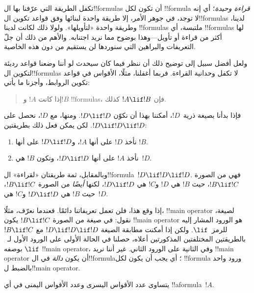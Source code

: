 \documentclass[../../../include/open-logic-section]{subfiles}
\begin{document}


\begin{explain}
تكفل الطريقة التي عرّفنا بها ال!!{formula}s أن تكون لكل !!{formula}
\emph{قراءة وحيدة}؛ أي إنه لا توجد، في جوهر الأمر، إلا طريقة واحدة
لبنائها وفق قواعد تكوين ال!!{formula}s لدينا، وطريقة واحدة
«لتأويلها». ولولا ذلك لكانت لدينا !!{formula}s ملتبسة، أي
!!{formula}s لها أكثر من قراءة أو تأويل---وهذا بوضوح مما نريد
اجتنابه. والأهم من ذلك أن جلّ التعريفات والبراهين التي سنوردها لن
يستقيم من دون هذه الخاصية.

ولعل أفضل سبيل إلى توضيح ذلك أن ننظر فيما كان سيحدث لو أننا وضعنا
قواعد رديئة لتكوين ال!!{formula}s لا تكفل وحدانية القراءة. فربما
أغفلنا، مثلًا، الأقواس في قواعد تكوين الروابط، وأجزنا ما يأتي:
\begin{quote}
إذا كانت $!A$ و$!B$ !!{formula}s، فإن $!A \lif !B$ كذلك.
\end{quote}
فإذا بدأنا بصيغة ذرية~$!D$، أمكننا بهذا أن نكوّن $!D
\lif !D$. ومنها، مع $!D$، نحصل على $!D \lif !D
\lif !D$. لكن يمكن فعل ذلك بطريقتين:
\begin{enumerate}
\item نأخذ $!D$ على أنها $!A$، و$!D \lif !D$ على أنها $!B$.
\item نأخذ $!A$ على أنها $!D \lif !D$، وتكون $!B$ هي~$!D$.
\end{enumerate}
وبالمقابل، ثمة طريقتان «لقراءة» ال!!{formula}~$!D \lif !D \lif
!D$. فهي من الصورة $!B \lif !C$، حيث $!B$ هي $!D$ و$!C$ هي $!D
\lif !D$، لكنها \emph{أيضًا} من الصورة $!B \lif !C$، حيث $!B$ هي
$!D \lif !D$ و$!C$ هي~$!D$.

إذا وقع هذا، فلن تعمل تعريفاتنا دائمًا. فعندما نعرّف، مثلًا،
!!{main operator} لصيغة، نقول: في صيغة من الصورة $!B \lif !C$ يكون
!!{main operator} هو الورود المشار إليه للرمز~$\lif$. ولكن إذا
أمكنت مطابقة الصيغة $!D \lif !D \lif !D$ مع $!B \lif !C$
بالطريقتين المختلفتين المذكورتين أعلاه، حصلنا في الحالة الأولى على
الورود الأول لـ~$\lif$ بوصفه !!{main operator}، وفي الثانية على
الورود الثاني. غير أننا نريد !!{main operator} أن يكون
\emph{دالة} في ال!!{formula}؛ أي يجب أن يكون لكل !!{formula} ورود
واحد بالضبط ل!!{main operator}.
\end{explain}

\begin{lem}
يتساوى عدد الأقواس اليسرى وعدد الأقواس اليمنى في أي
!!a{formula}~$!A$.
\end{lem}
\end{document}
